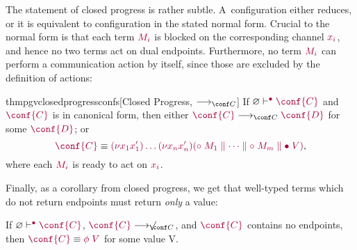 \documentclass[main.tex]{subfiles}
\begin{document}
The statement of closed progress is rather subtle. A~configuration either reduces, or it is equivalent to configuration in the stated normal form. Crucial to the normal form is that each term $\tm{M_i}$ is blocked on the corresponding channel $\tm{x_i}$, and hence no two terms act on dual endpoints. Furthermore, no term $\tm{M_i}$ can perform a communication action by itself, since those are excluded by the definition of actions:
\begin{restatabletheorem}{thmpgvclosedprogressconfs}[Closed Progress, $\cred$]
  \label{lem:pgv-closed-progress-confs}
  If $\cseq[\main]{\emptyenv}{\conf{C}}$ and $\tm{\conf{C}}$ is in canonical form, then either $\tm{\conf{C}}\cred\tm{\conf{D}}$ for some $\tm{\conf{D}}$; or
  \[
    \tm{\conf{C}}
    \equiv
    \tm{\res{x_1}{x'_1}{\dots\res{x_n}{x'_n}{(\child\;M_1\parallel\dots\parallel\child\;M_m\parallel\main\;V)}}},
  \]
  where each $\tm{M_i}$ is ready to act on $\tm{x_i}$.
\end{restatabletheorem}


Finally, as a corollary from closed progress, we get that well-typed terms which do not return endpoints must return \emph{only} a value:
\begin{corollary}
  \label{cor:pgv-closed-progress}
  If $\cseq[\main]{\emptyenv}{\conf{C}}$, $\tm{\conf{C}}\centernot\cred$, and $\tm{\conf{C}}$ contains no endpoints, then $\tm{\conf{C}}\equiv\tm{\phi\;V}$ for some value V.
\end{corollary}
\end{document}
